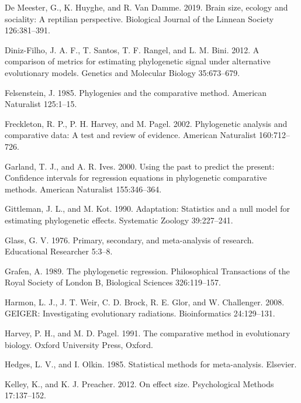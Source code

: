 \documentclass[
]{article}
\begin{document}
\leavevmode\hypertarget{ref-DeMeester2019}{}%
De Meester, G., K. Huyghe, and R. Van Damme. 2019. Brain size, ecology
and sociality: A reptilian perspective. Biological Journal of the
Linnean Society 126:381--391.

\leavevmode\hypertarget{ref-DinizFilho2012}{}%
Diniz-Filho, J. A. F., T. Santos, T. F. Rangel, and L. M. Bini. 2012. A
comparison of metrics for estimating phylogenetic signal under
alternative evolutionary models. Genetics and Molecular Biology
35:673--679.

\leavevmode\hypertarget{ref-Felsenstein1985}{}%
Felsenstein, J. 1985. Phylogenies and the comparative method. American
Naturalist 125:1--15.

\leavevmode\hypertarget{ref-Freckleton_et_al2002}{}%
Freckleton, R. P., P. H. Harvey, and M. Pagel. 2002. Phylogenetic
analysis and comparative data: A test and review of evidence. American
Naturalist 160:712--726.

\leavevmode\hypertarget{ref-GarlandIves2000}{}%
Garland, T. J., and A. R. Ives. 2000. Using the past to predict the
present: Confidence intervals for regression equations in phylogenetic
comparative methods. American Naturalist 155:346--364.

\leavevmode\hypertarget{ref-Gittleman1990}{}%
Gittleman, J. L., and M. Kot. 1990. Adaptation: Statistics and a null
model for estimating phylogenetic effects. Systematic Zoology
39:227--241.

\leavevmode\hypertarget{ref-Glass1976}{}%
Glass, G. V. 1976. Primary, secondary, and meta-analysis of research.
Educational Researcher 5:3--8.

\leavevmode\hypertarget{ref-Grafen1989}{}%
Grafen, A. 1989. The phylogenetic regression. Philosophical Transactions
of the Royal Society of London B, Biological Sciences 326:119--157.

\leavevmode\hypertarget{ref-Harmon2008}{}%
Harmon, L. J., J. T. Weir, C. D. Brock, R. E. Glor, and W. Challenger.
2008. GEIGER: Investigating evolutionary radiations. Bioinformatics
24:129--131.

\leavevmode\hypertarget{ref-HarveyPagel1991}{}%
Harvey, P. H., and M. D. Pagel. 1991. The comparative method in
evolutionary biology. Oxford University Press, Oxford.

\leavevmode\hypertarget{ref-HedgesOlkin1985}{}%
Hedges, L. V., and I. Olkin. 1985. Statistical methods for
meta-analysis. Elsevier.

\leavevmode\hypertarget{ref-Kelley2012}{}%
Kelley, K., and K. J. Preacher. 2012. On effect size. Psychological
Methods 17:137--152.
\end{document}
